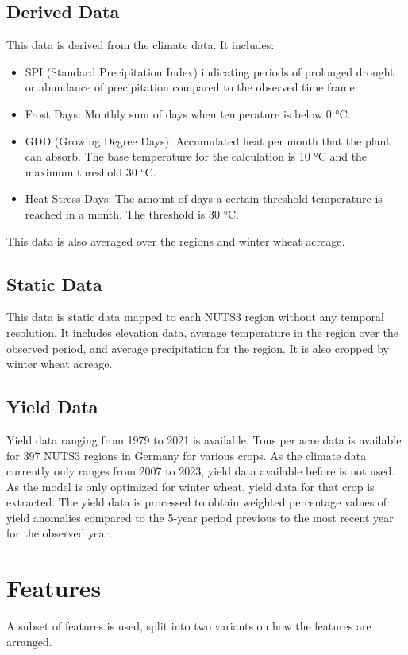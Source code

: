 \documentclass{article}
\begin{document}
\subsection{Derived Data}
This data is derived from the climate data. It includes:
\begin{itemize}
	\item SPI (Standard Precipitation Index) indicating periods of prolonged drought or abundance of precipitation compared to the observed time frame.
	\item Frost Days: Monthly sum of days when temperature is below 0 °C.
	\item GDD (Growing Degree Days): Accumulated heat per month that the plant can absorb. The base temperature for the calculation is 10 °C and the maximum threshold 30 °C.
	\item Heat Stress Days: The amount of days a certain threshold temperature is reached in a month. The threshold is 30 °C.
\end{itemize}
This data is also averaged over the regions and winter wheat acreage.
\subsection{Static Data}
This data is static data mapped to each NUTS3 region without any temporal resolution. It includes elevation data, average temperature in the region over the observed period, and average precipitation for the region. It is also cropped by winter wheat acreage.
\subsection{Yield Data}
Yield data ranging from 1979 to 2021 is available. Tons per acre data is available for 397 NUTS3 regions in Germany for various crops. As the climate data currently only ranges from 2007 to 2023, yield data available before is not used. As the model is only optimized for winter wheat, yield data for that crop is extracted. The yield data is processed to obtain weighted percentage values of yield anomalies compared to the 5-year period previous to the most recent year for the observed year.
\section{Features}
A subset of features is used, split into two variants on how the features are arranged.
\end{document}
